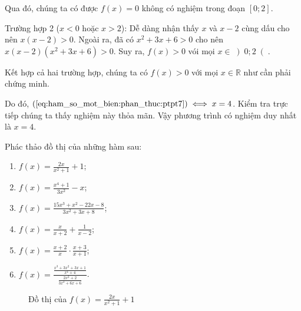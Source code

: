 Qua đó, chúng ta có được $f(x) = 0$ không có nghiệm trong đoạn $\left[0; 2\right]$.

\textcolor{colorEmphasis}{Trường hợp 2 ($x < 0$ hoặc $x > 2$)}: Dễ dàng nhận thấy $x$ và $x - 2$ cùng dấu cho nên $x(x - 2) > 0$. Ngoài ra, đã có $x^2 + 3x + 6 > 0$ cho nên $x\left(x - 2\right)\left(x^2 + 3x + 6\right) > 0$. Suy ra, $f(x) > 0$ vói mọi $x \in \left)0; 2\right($.

Kết hợp cả hai trường hợp, chúng ta có $f(x) > 0$ với mọi $x \in \mathbb{R}$ như cần phải chứng minh.

Do đó, $\text{\refeq{eq:ham_so_mot_bien:phan_thuc:ptpt7}} \iff x = 4$. Kiểm tra trực tiếp chúng ta thấy nghiệm này thỏa mãn. Vậy phương trình có nghiệm duy nhất là $x = 4$.

\exercise Phác thảo đồ thị của những hàm sau:

\begin{multicols}{2}
   \begin{enumerate}
      \item $\displaystyle f(x) = \frac{2x}{x^2 + 1} + 1$;
      \item $\displaystyle f(x) = \frac{x^4 + 1}{3x^2} - x$;
      \item $\displaystyle f(x) = \frac{15x^3 + x^2 - 22x - 8}{3x^2 + 3x + 8}$;
      \item $\displaystyle f(x) = \frac{x}{x + 2} + \frac{1}{x - 2}$;
      \item $\displaystyle f(x) = \frac{x + 2}{x} \cdot \frac{x + 3}{x + 1}$;
      \item $\displaystyle f(x) = \frac{\frac{x^3 + 3x^2 + 3x + 1}{x^4 + 4}}{\frac{2x^2 + 2}{3x^2 + 6x + 6}}$.
   \end{enumerate}
\end{multicols}

\solution

\begin{figure}[H]
	\centering
	\caption{Đồ thị của $f(x) = \frac{2 x}{x^{2} + 1} + 1$}
\end{figure}

